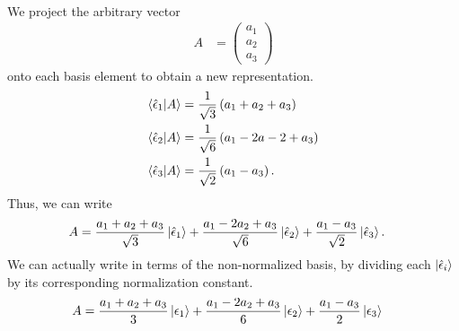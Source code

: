 \documentclass[10pt]{mypackage}
\newcommand{\ep}{\epsilon}
\begin{document}
\begin{example}
\begin{align*}
  \end{align*}
  We project the arbitrary vector
  \begin{align*}
    A &= \begin{pmatrix}a_1\\a_2\\a_3\end{pmatrix}
  \end{align*}
  onto each basis element to obtain a new representation.
  \begin{align*}
    \braket{\hat{\ep}_{1}}{A} &= \frac{1}{\sqrt{3}} \left(a_1 + a_2 + a_3\right)\\
    \braket{\hat{\ep}_{2}}{A} &= \frac{1}{\sqrt{6}}\left(a_1 - 2a-2 + a_3\right)\\
    \braket{\hat{\ep}_{3}}{A} &= \frac{1}{\sqrt{2}} \left(a_1 - a_3\right).
  \end{align*}
  Thus, we can write
  \begin{align*}
    A &= \frac{a_1 + a_2 + a_3}{\sqrt{3}}\ket{\hat{\ep}_{1}} + \frac{a_1 - 2a_2 + a_3}{\sqrt{6}}\ket{\hat{\ep}_{2}} + \frac{a_1 - a_3}{\sqrt{2}}\ket{\hat{\ep}_{3}}.
  \end{align*}
  We can actually write in terms of the non-normalized basis, by dividing each $\ket{\hat{\ep}_{i}}$ by its corresponding normalization constant.
  \begin{align*}
    A &= \frac{a_1 + a_2 + a_3}{3}\ket{\ep_{1}} + \frac{a_1 - 2a_2 + a_3}{6}\ket{\ep_{2}} + \frac{a_1 - a_3}{2}\ket{\ep_{3}}
  \end{align*}
\end{example}
\end{document}
